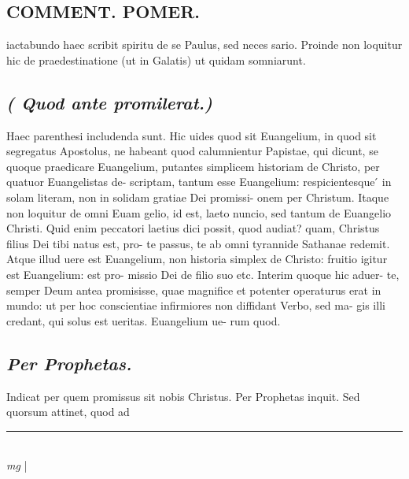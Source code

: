 \documentclass{article}
\begin{document}
\begin{pages}
\section*{COMMENT. POMER.  }\pstart iactabundo haec scribit spiritu de se Paulus, sed neces sario. Proinde non loquitur hic de praedestinatione (ut in Galatis) ut quidam somniarunt.  \pend
{}
{}
\subsection*{\textit{( Quod ante promilerat.) }}\pstart Haec parenthesi includenda sunt. Hic uides quod sit Euangelium, in quod sit segregatus Apostolus, ne habeant quod calumnientur Papistae, qui dicunt, se quoque praedicare Euangelium, putantes simplicem historiam de Christo, per quatuor Euangelistas de- scriptam, tantum esse Euangelium: respicientesque ́ in solam literam, non in solidam gratiae Dei promissi- onem per Christum. Itaque non loquitur de omni Euam gelio, id est, laeto nuncio, sed tantum de Euangelio Christi. Quid enim peccatori laetius dici possit, quod audiat? quam, Christus filius Dei tibi natus est, pro- te passus, te ab omni tyrannide Sathanae redemit.  Atque illud uere est Euangelium, non historia simplex de Christo: fruitio igitur est Euangelium: est pro- missio Dei de filio suo etc. Interim quoque hic aduer- te, semper Deum antea promisisse, quae magnifice et potenter operaturus erat in mundo: ut per hoc conscientiae infirmiores non diffidant Verbo, sed ma- gis illi credant, qui solus est ueritas.  Euangelium ue- rum quod.   \pend
{}
{}
\subsection*{\textit{Per Prophetas. }}\pstart Indicat per quem promissus sit nobis Christus.  Per Prophetas inquit. Sed quorsum attinet, quod ad  \pend\pstart  \pend
\vspace{0.5cm}\noindent
\vspace{0.2cm}\rule{1cm}{0.2pt}\\ 
\hspace{0.2cm}\textit{mg}
\footnotesize 
\normalsize| 

\end{pages}
\end{document}
